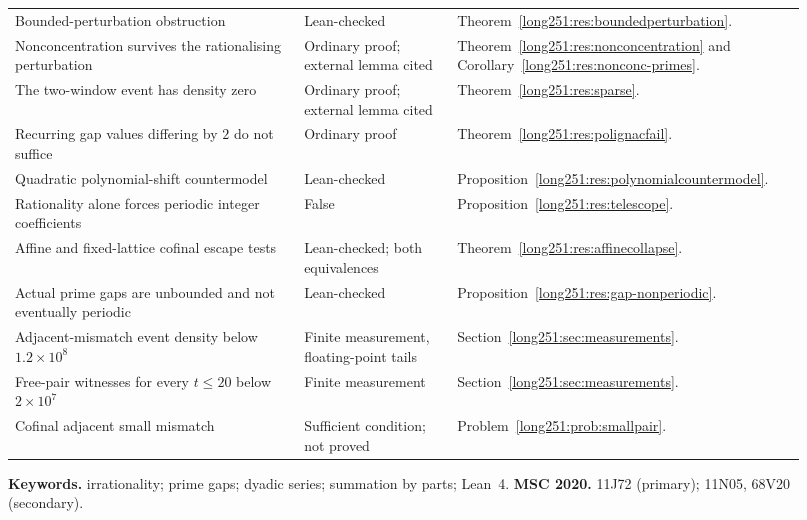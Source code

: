 \begin{longtable}{@{}
  >{\raggedright\arraybackslash}p{0.34\linewidth}
  >{\raggedright\arraybackslash}p{0.18\linewidth}
  >{\raggedright\arraybackslash}p{0.40\linewidth}@{}}
Bounded-perturbation obstruction & Lean-checked & Theorem~\ref{long251:res:boundedperturbation}. \\
Nonconcentration survives the rationalising perturbation & Ordinary proof; external lemma cited & Theorem~\ref{long251:res:nonconcentration} and Corollary~\ref{long251:res:nonconc-primes}. \\
The two-window event has density zero & Ordinary proof; external lemma cited & Theorem~\ref{long251:res:sparse}. \\
Recurring gap values differing by $2$ do not suffice & Ordinary proof & Theorem~\ref{long251:res:polignacfail}. \\
Quadratic polynomial-shift countermodel & Lean-checked & Proposition~\ref{long251:res:polynomialcountermodel}. \\
Rationality alone forces periodic integer coefficients & False & Proposition~\ref{long251:res:telescope}. \\
Affine and fixed-lattice cofinal escape tests & Lean-checked; both equivalences & Theorem~\ref{long251:res:affinecollapse}. \\
Actual prime gaps are unbounded and not eventually periodic & Lean-checked & Proposition~\ref{long251:res:gap-nonperiodic}. \\
Adjacent-mismatch event density below $1.2\times10^{8}$ & Finite measurement, floating-point tails & Section~\ref{long251:sec:measurements}. \\
Free-pair witnesses for every $t\le20$ below $2\times10^{7}$ & Finite measurement & Section~\ref{long251:sec:measurements}. \\
Cofinal adjacent small mismatch & Sufficient condition; not proved & Problem~\ref{long251:prob:smallpair}. \\
\bottomrule
\end{longtable}
\endgroup

\smallskip
{}

\medskip
\noindent\textbf{Keywords.} irrationality; prime gaps; dyadic series;
summation by parts; Lean~4.
\qquad
\textbf{MSC 2020.} 11J72 (primary); 11N05, 68V20 (secondary).

